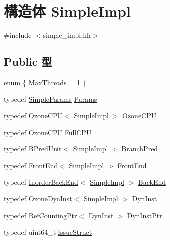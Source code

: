 \hypertarget{structSimpleImpl}{
\section{構造体 SimpleImpl}
\label{structSimpleImpl}
}


{\ttfamily \#include $<$simple\_\-impl.hh$>$}\subsection*{Public 型}
\begin{DoxyCompactItemize}
\item 
enum \{ \hyperlink{structSimpleImpl_a1f9aebf1de3ebbf4283a4dcf73308562ab491ddc45d51d0ea7f735c1926390fdb}{MaxThreads} =  1
 \}
\item 
typedef \hyperlink{classSimpleParams}{SimpleParams} \hyperlink{structSimpleImpl_a97a13164dd1bc9c081a6c711e68e6160}{Params}
\item 
typedef \hyperlink{classOzoneCPU}{OzoneCPU}$<$ \hyperlink{structSimpleImpl}{SimpleImpl} $>$ \hyperlink{structSimpleImpl_a508935a6f5fec404726fbffb104f059a}{OzoneCPU}
\item 
typedef \hyperlink{classOzoneCPU}{OzoneCPU} \hyperlink{structSimpleImpl_a3b44bd64928743998e6879a07520b3b7}{FullCPU}
\item 
typedef \hyperlink{classBPredUnit}{BPredUnit}$<$ \hyperlink{structSimpleImpl}{SimpleImpl} $>$ \hyperlink{structSimpleImpl_aa571eb59ab7b40e0ebe2f075b7351a87}{BranchPred}
\item 
typedef \hyperlink{classFrontEnd}{FrontEnd}$<$ \hyperlink{structSimpleImpl}{SimpleImpl} $>$ \hyperlink{structSimpleImpl_a97cfe75c4e2ec15e611a76b57827e045}{FrontEnd}
\item 
typedef \hyperlink{classInorderBackEnd}{InorderBackEnd}$<$ \hyperlink{structSimpleImpl}{SimpleImpl} $>$ \hyperlink{structSimpleImpl_a6f0c893d4a0613a8ccefa1eb8a8cf3bf}{BackEnd}
\item 
typedef \hyperlink{classOzoneDynInst}{OzoneDynInst}$<$ \hyperlink{structSimpleImpl}{SimpleImpl} $>$ \hyperlink{structSimpleImpl_a69c9211fabf458755bcbe8aaa6b13f09}{DynInst}
\item 
typedef \hyperlink{classRefCountingPtr}{RefCountingPtr}$<$ \hyperlink{classOzoneDynInst}{DynInst} $>$ \hyperlink{structSimpleImpl_a97c1adaf6da40f1dd1f86fe0b3b51249}{DynInstPtr}
\item 
typedef uint64\_\-t \hyperlink{structSimpleImpl_ad906a02b6e2b621a30df354fa780da6f}{IssueStruct}
\end{DoxyCompactItemize}


